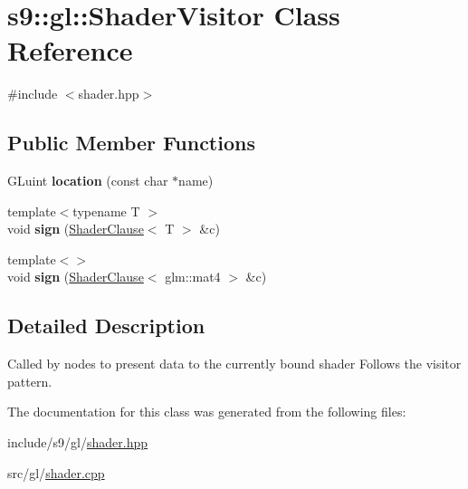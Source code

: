 \hypertarget{classs9_1_1gl_1_1ShaderVisitor}{\section{s9\-:\-:gl\-:\-:Shader\-Visitor Class Reference}
\label{classs9_1_1gl_1_1ShaderVisitor}
}


{\ttfamily \#include $<$shader.\-hpp$>$}

\subsection*{Public Member Functions}
\begin{DoxyCompactItemize}
\item 
\hypertarget{classs9_1_1gl_1_1ShaderVisitor_a027672292c9ed8674ef6d42367d7f5c2}{G\-Luint {\bfseries location} (const char $\ast$name)}\label{classs9_1_1gl_1_1ShaderVisitor_a027672292c9ed8674ef6d42367d7f5c2}

\item 
\hypertarget{classs9_1_1gl_1_1ShaderVisitor_a6f4dc7ed3511ee490f0c2f30db2096f5}{{\footnotesize template$<$typename T $>$ }\\void {\bfseries sign} (\hyperlink{structs9_1_1gl_1_1ShaderClause}{Shader\-Clause}$<$ T $>$ \&c)}\label{classs9_1_1gl_1_1ShaderVisitor_a6f4dc7ed3511ee490f0c2f30db2096f5}

\item 
\hypertarget{classs9_1_1gl_1_1ShaderVisitor_ae15a369eeff93daa9d884fb746fd793a}{{\footnotesize template$<$$>$ }\\void {\bfseries sign} (\hyperlink{structs9_1_1gl_1_1ShaderClause}{Shader\-Clause}$<$ glm\-::mat4 $>$ \&c)}\label{classs9_1_1gl_1_1ShaderVisitor_ae15a369eeff93daa9d884fb746fd793a}

\end{DoxyCompactItemize}


\subsection{Detailed Description}
Called by nodes to present data to the currently bound shader Follows the visitor pattern. 

The documentation for this class was generated from the following files\-:\begin{DoxyCompactItemize}
\item 
include/s9/gl/\hyperlink{shader_8hpp}{shader.\-hpp}\item 
src/gl/\hyperlink{shader_8cpp}{shader.\-cpp}\end{DoxyCompactItemize}
